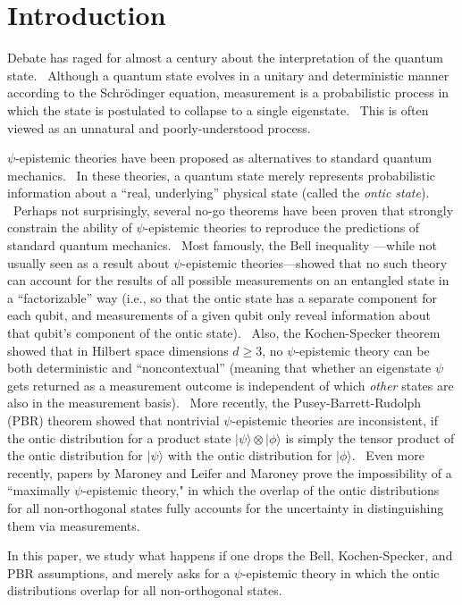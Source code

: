 \documentclass[letterpaper,12pt]{article}
\begin{document}
\section{Introduction}

Debate has raged for almost a century about the interpretation of the
quantum state. \ Although a quantum state evolves in a unitary and
deterministic manner according to the Schr\"{o}dinger equation, measurement
is a probabilistic process in which the state is postulated to collapse to a
single eigenstate. \ This is often viewed as an unnatural and
poorly-understood process.

$\psi$-epistemic theories have been proposed as alternatives to standard quantum
mechanics. \ In these theories, a quantum state merely represents
probabilistic information about a ``real, underlying'' physical state
(called the \emph{ontic state}). \ Perhaps not surprisingly, several no-go theorems
have been proven that strongly constrain the ability of $\psi$-epistemic
theories to reproduce the predictions of standard quantum mechanics. \ Most
famously, the Bell inequality \cite{bell}---while not usually seen as a result about $\psi$-epistemic
theories---showed that no such theory can account for the results of all possible measurements on an entangled state in a
``factorizable'' way (i.e., so that the ontic state has a separate component for each qubit, and measurements of a given qubit only reveal information about that qubit's component of the ontic state). \ Also, the Kochen-Specker theorem \cite{ks} showed that in Hilbert space
dimensions $d\geq 3$, no $\psi$-epistemic theory can be both deterministic and
``noncontextual'' (meaning that whether an eigenstate $\psi$ gets returned
as a measurement outcome is independent of which \emph{other} states are
also in the measurement basis). \ More recently, the Pusey-Barrett-Rudolph
(PBR) theorem \cite{pbr} showed that nontrivial $\psi$-epistemic theories are inconsistent, if
the ontic distribution for a product state $| \psi \rangle \otimes %
 | \phi \rangle $ is simply the tensor product of the ontic
distribution for $ | \psi \rangle $ with the ontic distribution for
$ | \phi \rangle $. \ Even more recently, papers by Maroney \cite{mar} and Leifer and Maroney \cite{marleif} prove the impossibility of a ``maximally $\psi$-epistemic theory," in which the overlap of the ontic distributions for all non-orthogonal states fully accounts for the uncertainty in distinguishing them via measurements. \

In this paper, we study what happens
if one drops the Bell, Kochen-Specker, and PBR assumptions, and merely asks for a $\psi$-epistemic theory in which the ontic distributions overlap for all non-orthogonal states. \
\end{document}
